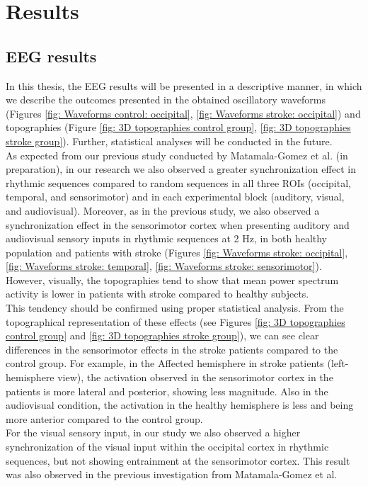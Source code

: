 \chapter{Results}
\section{EEG results}
In this thesis, the EEG results will be presented in a descriptive manner, in which we describe the outcomes presented in the obtained oscillatory waveforms (Figures \ref{fig: Waveforms control: occipital}, \ref{fig: Waveforms stroke: occipital}) and topographies (Figure \ref{fig: 3D topographies control group}, \ref{fig: 3D topographies stroke group}). Further, statistical analyses will be conducted in the future.  \\
As expected from our previous study conducted by Matamala-Gomez et al. (in preparation), in our research we also observed a greater synchronization effect in rhythmic sequences compared to random sequences in all three ROIs (occipital, temporal, and sensorimotor) and in each experimental block (auditory, visual, and audiovisual). Moreover, as in the previous study, we also observed a synchronization effect in the sensorimotor cortex when presenting auditory and audiovisual sensory inputs in rhythmic sequences at 2 Hz, in both healthy population and patients with stroke (Figures \ref{fig: Waveforms stroke: occipital}, \ref{fig: Waveforms stroke: temporal}, \ref{fig: Waveforms stroke: sensorimotor}). However, visually, the topographies tend to show that mean power spectrum activity is lower in patients with stroke compared to healthy subjects.\\
This tendency should be confirmed using proper statistical analysis. From the topographical representation of these effects (see Figures \ref{fig: 3D topographies control group} and \ref{fig: 3D topographies stroke group}), we can see clear differences in the sensorimotor effects in the stroke patients compared to the control group. For example, in the Affected hemisphere in stroke patients (left-hemisphere view), the activation observed in the sensorimotor cortex in the patients is more lateral and posterior, showing less magnitude. Also in the audiovisual condition, the activation in the healthy hemisphere is less and being more anterior compared to the control group. \\
For the visual sensory input, in our study we also observed a higher synchronization of the visual input within the occipital cortex in rhythmic sequences, but not showing entrainment at the sensorimotor cortex. This result was also observed in the previous investigation from Matamala-Gomez et al. \\

